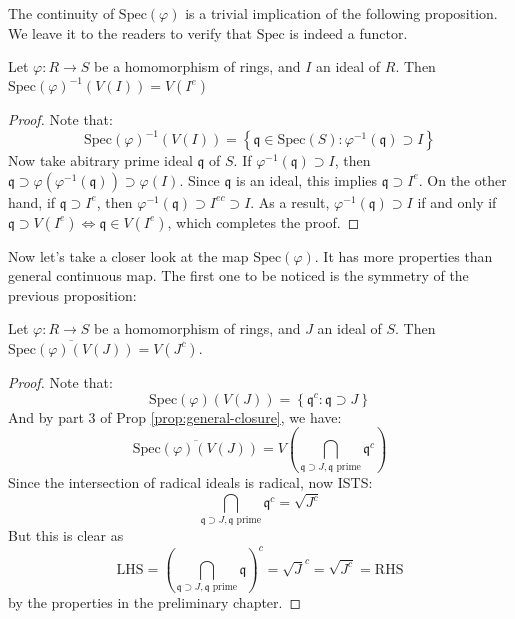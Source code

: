\documentclass{note-eng}
\begin{document}
The continuity of $\mathrm{Spec}(\varphi)$ is a trivial implication of the following proposition. We leave it to the readers to verify that $\mathrm{Spec}$ is indeed a functor.

\begin{proposition}
    Let $\varphi: R \rightarrow S$ be a homomorphism of rings, and $I$ an ideal of $R$. Then $\mathrm{Spec}(\varphi)^{-1}(V(I)) = V(I^e)$
\end{proposition}

\begin{proof}
    Note that:
    $$\mathrm{Spec}(\varphi) ^{-1} (V(I)) = \left\lbrace \mathfrak{q} \in \mathrm{Spec}(S): \varphi ^{-1} (\mathfrak{q}) \supset I \right\rbrace$$
    Now take abitrary prime ideal $\mathfrak{q}$ of $S$. If $\varphi ^{-1} (\mathfrak{q}) \supset I$, then $\mathfrak{q} \supset \varphi(\varphi ^{-1} (\mathfrak{q})) \supset \varphi(I)$. Since $\mathfrak{q}$ is an ideal, this implies $\mathfrak{q} \supset I^e$. On the other hand, if $\mathfrak{q} \supset I^e$, then $\varphi ^{-1}(\mathfrak{q}) \supset I^{ec} \supset I$. As a result, $\varphi ^{-1}(\mathfrak{q}) \supset I$ if and only if $\mathfrak{q} \supset V(I^e) \Leftrightarrow \mathfrak{q} \in V(I^e)$, which completes the proof.
\end{proof}

Now let's take a closer look at the map $\mathrm{Spec}(\varphi)$. It has more properties than general continuous map. The first one to be noticed is the symmetry of the previous proposition:

\begin{proposition} \label{prop:spec-image-closure}
    Let $\varphi: R \rightarrow S$ be a homomorphism of rings, and $J$ an ideal of $S$. Then $\overline{\mathrm{Spec}(\varphi)(V(J))} = V(J^c)$.
\end{proposition}

\begin{proof}
    Note that:
    $$\mathrm{Spec}(\varphi) (V(J)) = \left\lbrace \mathfrak{q}^c: \mathfrak{q} \supset J \right\rbrace$$
    And by part 3 of Prop \ref{prop:general-closure}, we have:
    $$\overline{\mathrm{Spec}(\varphi)(V(J))} = V \left( \bigcap\limits_{\mathfrak{q} \supset J, \mathfrak{q} \text{ prime}} \mathfrak{q}^c\right)$$
    Since the intersection of radical ideals is radical, now ISTS:
    $$\bigcap\limits_{\mathfrak{q} \supset J, \mathfrak{q} \text{ prime}} \mathfrak{q}^c = \sqrt{J^c}$$
    But this is clear as
    $$\mathrm{LHS} = \left(\bigcap\limits_{\mathfrak{q} \supset J, \mathfrak{q} \text{ prime}} \mathfrak{q}\right)^c = \sqrt{J}^c = \sqrt{J^c} = \mathrm{RHS}$$
    by the properties in the preliminary chapter.
\end{proof}
\end{document}
